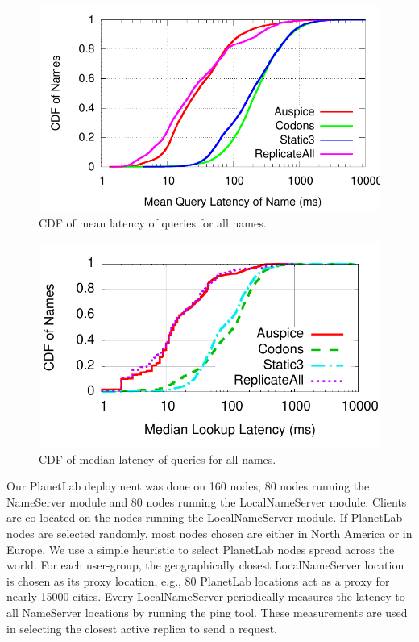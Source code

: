 \begin{figure}
\includegraphics[scale=0.6]{graph/system-exp/cdf-names-mean.pdf}
\caption{CDF of mean latency of queries for all names.}
\label{fig:namesquerymeancdf}
\end{figure}

\begin{figure}
\includegraphics[scale=0.6]{graph/system-exp/cdf-names-median.pdf}
\caption{CDF of median latency of queries for all names.}
\label{fig:namesquerymediancdf}
\end{figure}



Our PlanetLab deployment was done on 160 nodes, 80 nodes running the NameServer module and 80 nodes running the LocalNameServer module. Clients are co-located on the nodes running the LocalNameServer module. If PlanetLab nodes are selected randomly, most nodes chosen are either in North America or in Europe. We use a simple heuristic to select PlanetLab nodes spread across the world.
For each user-group, the geographically closest LocalNameServer location is chosen as its proxy location, e.g., 80 PlanetLab locations  act as a proxy for nearly 15000 cities.  Every LocalNameServer periodically measures the latency to all NameServer locations by running the ping tool. These measurements are used in selecting the closest active replica to send a request.


